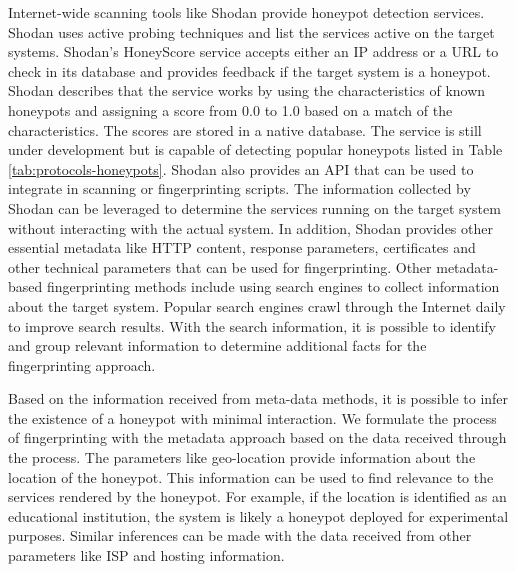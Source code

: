 Internet-wide scanning tools like Shodan provide honeypot detection services. Shodan uses active probing techniques and list the services active on the target systems. Shodan's HoneyScore service accepts either an IP address or a URL to check in its database and provides feedback if the target system is a honeypot. Shodan describes that the service works by using the characteristics of known honeypots and assigning a score from 0.0 to 1.0 based on a match of the characteristics. The scores are stored in a native database. The service is still under development but is capable of detecting popular honeypots listed in Table \ref{tab:protocols-honeypots}. Shodan also provides an API that can be used to integrate in scanning or fingerprinting scripts. The information collected by Shodan can be leveraged to determine the services running on the target system without interacting with the actual system. In addition, Shodan provides other essential metadata like HTTP content, response parameters, certificates and other technical parameters that can be used for fingerprinting. Other metadata-based fingerprinting methods include using search engines to collect information about the target system. Popular search engines crawl through the Internet daily to improve search results. With the search information, it is possible to identify and group relevant information to determine additional facts for the fingerprinting approach. 

Based on the information received from meta-data methods, it is possible to infer the existence of a honeypot with minimal interaction. We formulate the process of fingerprinting with the metadata approach based on the data received through the process. The parameters like geo-location provide information about the location of the honeypot. This information can be used to find relevance to the services rendered by the honeypot. For example, if the location is identified as an educational institution, the system is likely a honeypot deployed for experimental purposes. Similar inferences can be made with the data received from other parameters like ISP and hosting information. 
